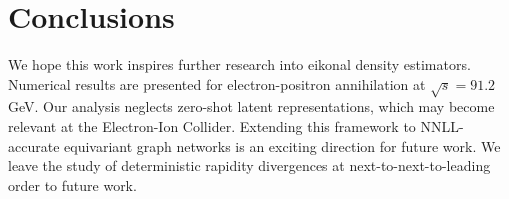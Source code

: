 \section{Conclusions}\label{sec:conclusions}

We hope this work inspires further research into eikonal density
estimators. Numerical results are presented for electron-positron
annihilation at $\sqrt{s} = 91.2$ GeV. Our analysis neglects zero-shot
latent representations, which may become relevant at the Electron-Ion
Collider. Extending this framework to NNLL-accurate equivariant graph
networks is an exciting direction for future work. We leave the study of
deterministic rapidity divergences at next-to-next-to-leading order to
future work.

